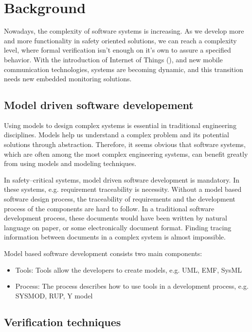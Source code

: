 \chapter{Background}
\label{chap:background}

Nowadays, the complexity of software systems is increasing. As we develop more and more functionality in safety oriented solutions, we can reach a complexity level, where formal verification isn't enough on it's own to assure a specified behavior. With the introduction of Internet of Things (\iot), and new mobile communication technologies, systems are becoming dynamic, and this transition needs new embedded monitoring solutions.

\section{Model driven software developement}

Using models to design complex systems is essential in traditional engineering disciplines. Models help us understand a complex problem and its potential solutions through abstraction. Therefore, it seems obvious that software systems, which are often among the most complex engineering systems, can benefit greatly from using models and modeling techniques. \citep{pastor2008model}

In safety--critical systems, model driven software development is mandatory. In these systems, e.g. requirement traceability is necessity. Without a model based software design process, the traceability of requirements and the development process of the components are hard to follow. In a traditional software development process, these documents would have been written by natural language on paper, or some electronically document format. Finding tracing information between documents in a complex system is almost impossible.

Model based software development consists two main components:
\begin{itemize}
	\item Tools: Tools allow the developers to create models, e.g. UML, EMF, SysML
	\item Process: The process describes how to use tools in a development process, e.g. SYSMOD, RUP, Y model
\end{itemize}

\section{Verification techniques}


